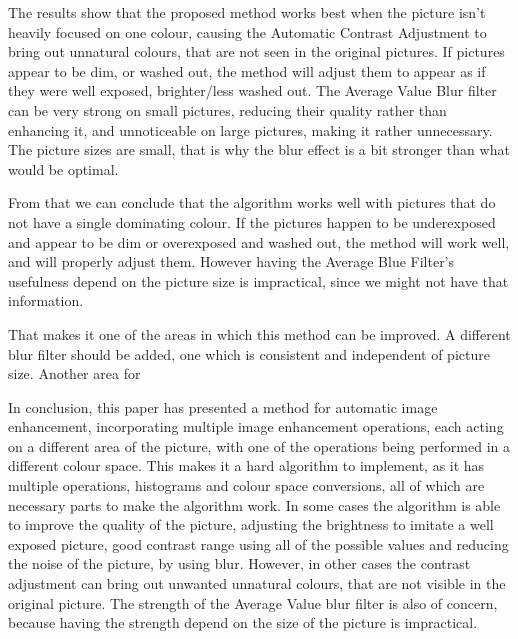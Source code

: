 \documentclass[journal,transmag]{IEEEtran}
\begin{document}
The results show that the proposed method works best when the picture isn't heavily focused on one colour, causing the Automatic Contrast Adjustment to bring out unnatural colours, that are not seen in the original pictures. If pictures appear to be dim, or washed out, the method will adjust them to appear as if they were well exposed, brighter/less washed out. 
The Average Value Blur filter can be very strong on small pictures, reducing their quality rather than enhancing it, and unnoticeable on large pictures, making it rather unnecessary. The picture sizes are small, that is why the blur effect is a bit stronger than what would be optimal.

From that we can conclude that the algorithm works well with pictures that do not have a single dominating colour. If the pictures happen to be underexposed and appear to be dim or overexposed and washed out, the method will work well, and will properly adjust them. However having the Average Blue Filter's usefulness depend on the picture size is impractical, since we might not have that information.

That makes it one of the areas in which this method can be improved. A different blur filter should be added, one which is consistent and independent of picture size. Another area for 

In conclusion, this paper has presented a method for automatic image enhancement, incorporating multiple image enhancement operations, each acting on a different area of the picture, with one of the operations being performed in a different colour space. This makes it a hard algorithm to implement, as it has multiple operations, histograms and colour space conversions, all of which are necessary parts to make the algorithm work. In some cases the algorithm is able to improve the quality of the picture, adjusting the brightness to imitate a well exposed picture, good contrast range using all of the possible values and reducing the noise of the picture, by using blur. However, in other cases the contrast adjustment can bring out unwanted unnatural colours, that are not visible in the original picture. The strength of the Average Value blur filter is also of concern, because having the strength depend on the size of the picture is impractical.





\end{document}
